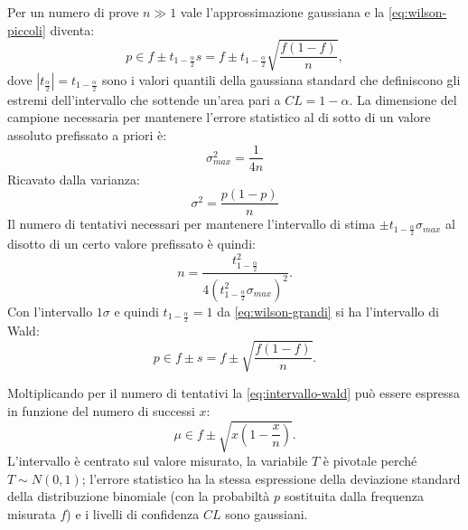 Per un numero di prove $n\gg 1$ vale l'approssimazione gaussiana e la \ref{eq:wilson-piccoli} diventa:
\begin{equation}
\label{eq:wilson-grandi}
p\in f\pm { t }_{ 1-\frac { \alpha  }{ 2 }  }s=f\pm { t }_{ 1-\frac { \alpha  }{ 2 }  }\sqrt { \frac { f\left( 1-f \right)  }{ n }  } ,
\end{equation}
dove $\left| { t }_{ \frac { \alpha  }{ 2 }  } \right| ={ t }_{ 1-\frac { \alpha  }{ 2 }  }$ sono i valori quantili della gaussiana standard che definiscono gli estremi dell'intervallo che sottende un'area pari a $CL=1-\alpha$. La dimensione del campione necessaria per mantenere l'errore statistico al di sotto di un valore assoluto prefissato a priori è:
\begin{equation}
{ \sigma  }_{ max }^{ 2 }=\frac { 1 }{ 4n } 
\end{equation}
Ricavato dalla varianza:
\begin{equation}
{ \sigma  }^{ 2 }=\frac { p\left( 1-p \right)  }{ n } 
\end{equation}
Il numero di tentativi necessari per mantenere l'intervallo di stima $\pm { t }_{ 1-\frac { \alpha  }{ 2 }  }{ \sigma  }_{ max }$ al disotto di un certo valore prefissato è quindi:
\begin{equation}
n=\frac { { t }^{ 2 }_{ 1-\frac { \alpha  }{ 2 }  } }{ 4{ \left( { t }^{ 2 }_{ 1-\frac { \alpha  }{ 2 }  }{ \sigma  }_{ max } \right)  }^{ 2 } } .
\end{equation}
Con l'intervallo $1\sigma$ e quindi ${ t }_{ 1-\frac { \alpha  }{ 2 }  }=1$ da \ref{eq:wilson-grandi} si ha l'intervallo di Wald:
\begin{equation}
\label{eq:intervallo-wald}
p\in f\pm s=f\pm \sqrt { \frac { f\left( 1-f \right)  }{ n }  } .
\end{equation}

Moltiplicando per il numero di tentativi la \ref{eq:intervallo-wald} può essere espressa in funzione del numero di successi $x$:
\begin{equation}
\mu \in f\pm \sqrt { x\left( 1-\frac { x }{ n }  \right)  } .
\end{equation}
L'intervallo è centrato sul valore misurato, la variabile $T$ è pivotale perché $T\sim N(0,1)$; l'errore statistico ha la stessa espressione della deviazione standard della distribuzione binomiale (con la probabiltà $p$ sostituita dalla frequenza misurata $f$) e i livelli di confidenza $CL$ sono gaussiani.

